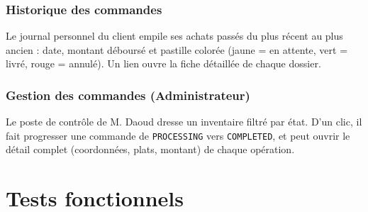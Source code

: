 \subsubsection{Historique des commandes}


Le journal personnel du client empile ses achats passés du plus récent au plus ancien : date, montant déboursé et pastille colorée (jaune = en attente, vert = livré, rouge = annulé). Un lien ouvre la fiche détaillée de chaque dossier.

\subsubsection{Gestion des commandes (Administrateur)}


Le poste de contrôle de M. Daoud dresse un inventaire filtré par état. D'un clic, il fait progresser une commande de \texttt{PROCESSING} vers \texttt{COMPLETED}, et peut ouvrir le détail complet (coordonnées, plats, montant) de chaque opération.

\section{Tests fonctionnels}


